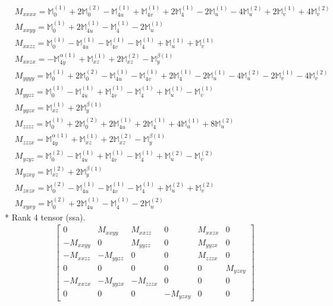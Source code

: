 \documentclass[fleqn,8pt,landscape]{jsarticle}
\begin{document}
\begin{align*}
& M_{xxxx} = \mathbb{M}_{0}^{(1)} + 2 \mathbb{M}_{0}^{(2)} - \mathbb{M}_{4u}^{(1)} + \mathbb{M}_{4v}^{(1)} + 2 \mathbb{M}_{4}^{(1)} - 2 \mathbb{M}_{u}^{(1)} - 4 \mathbb{M}_{u}^{(2)} + 2 \mathbb{M}_{v}^{(1)} + 4 \mathbb{M}_{v}^{(2)} \\
& M_{xxyy} = \mathbb{M}_{0}^{(1)} + 2 \mathbb{M}_{4u}^{(1)} - \mathbb{M}_{4}^{(1)} - 2 \mathbb{M}_{u}^{(1)} \\
& M_{xxzz} = \mathbb{M}_{0}^{(1)} - \mathbb{M}_{4u}^{(1)} - \mathbb{M}_{4v}^{(1)} - \mathbb{M}_{4}^{(1)} + \mathbb{M}_{u}^{(1)} + \mathbb{M}_{v}^{(1)} \\
& M_{xxzx} = - \mathbb{M}_{4y}^{\alpha(1)} + \mathbb{M}_{xz}^{(1)} + 2 \mathbb{M}_{xz}^{(2)} - \mathbb{M}_{y}^{\beta(1)} \\
& M_{yyyy} = \mathbb{M}_{0}^{(1)} + 2 \mathbb{M}_{0}^{(2)} - \mathbb{M}_{4u}^{(1)} - \mathbb{M}_{4v}^{(1)} + 2 \mathbb{M}_{4}^{(1)} - 2 \mathbb{M}_{u}^{(1)} - 4 \mathbb{M}_{u}^{(2)} - 2 \mathbb{M}_{v}^{(1)} - 4 \mathbb{M}_{v}^{(2)} \\
& M_{yyzz} = \mathbb{M}_{0}^{(1)} - \mathbb{M}_{4u}^{(1)} + \mathbb{M}_{4v}^{(1)} - \mathbb{M}_{4}^{(1)} + \mathbb{M}_{u}^{(1)} - \mathbb{M}_{v}^{(1)} \\
& M_{yyzx} = \mathbb{M}_{xz}^{(1)} + 2 \mathbb{M}_{y}^{\beta(1)} \\
& M_{zzzz} = \mathbb{M}_{0}^{(1)} + 2 \mathbb{M}_{0}^{(2)} + 2 \mathbb{M}_{4u}^{(1)} + 2 \mathbb{M}_{4}^{(1)} + 4 \mathbb{M}_{u}^{(1)} + 8 \mathbb{M}_{u}^{(2)} \\
& M_{zzzx} = \mathbb{M}_{4y}^{\alpha(1)} + \mathbb{M}_{xz}^{(1)} + 2 \mathbb{M}_{xz}^{(2)} - \mathbb{M}_{y}^{\beta(1)} \\
& M_{yzyz} = \mathbb{M}_{0}^{(2)} - \mathbb{M}_{4u}^{(1)} + \mathbb{M}_{4v}^{(1)} - \mathbb{M}_{4}^{(1)} + \mathbb{M}_{u}^{(2)} - \mathbb{M}_{v}^{(2)} \\
& M_{yzxy} = \mathbb{M}_{xz}^{(2)} + 2 \mathbb{M}_{y}^{\beta(1)} \\
& M_{zxzx} = \mathbb{M}_{0}^{(2)} - \mathbb{M}_{4u}^{(1)} - \mathbb{M}_{4v}^{(1)} - \mathbb{M}_{4}^{(1)} + \mathbb{M}_{u}^{(2)} + \mathbb{M}_{v}^{(2)} \\
& M_{xyxy} = \mathbb{M}_{0}^{(2)} + 2 \mathbb{M}_{4u}^{(1)} - \mathbb{M}_{4}^{(1)} - 2 \mathbb{M}_{u}^{(2)}
\end{align*}
* Rank 4 tensor (ssa).
\begin{align*}
\begin{bmatrix} 0 & M_{xxyy} & M_{xxzz} & 0 & M_{xxzx} & 0 \\ - M_{xxyy} & 0 & M_{yyzz} & 0 & M_{yyzx} & 0 \\ - M_{xxzz} & - M_{yyzz} & 0 & 0 & M_{zzzx} & 0 \\ 0 & 0 & 0 & 0 & 0 & M_{yzxy} \\ - M_{xxzx} & - M_{yyzx} & - M_{zzzx} & 0 & 0 & 0 \\ 0 & 0 & 0 & - M_{yzxy} & 0 & 0 \end{bmatrix}
\end{align*}
\end{document}
